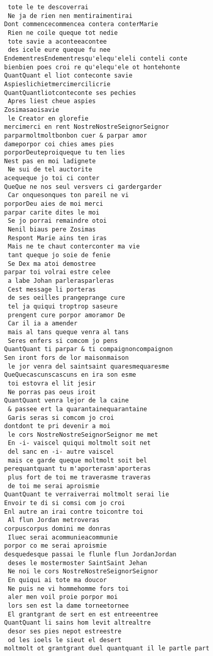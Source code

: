 \documentclass[
  letterpaper,
  DIV=11,
  numbers=noendperiod]{scrreprt}
\begin{document}
\begin{verbatim}
 tote le te descoverrai
 Ne ja de rien nen mentiraimentirai
Dont commencecommencea contera conterMarie
 Rien ne coile queque tot nedie
 tote savie a aconteeacontee
 des icele eure queque fu nee
EndementresEndementresqu'elequ'eleli conteli conte
bienbien poes croi re qu'elequ'ele ot hontehonte
QuantQuant el liot conteconte savie
Aspieslichietmercimercilicrie
QuantQuantliotconteconte ses pechies
 Apres liest cheue aspies
Zosimasaoisavie
 le Creator en glorefie
mercimerci en rent NostreNostreSeignorSeignor
parparmoltmoltbonbon cuer & parpar amor
dameporpor coi chies ames pies
porporDeuteproiqueque tu ten lies
Nest pas en moi ladignete
 Ne sui de tel auctorite
acequeque jo toi ci conter
QueQue ne nos seul versvers ci gardergarder
 Car onquesonques ton pareil ne vi
porporDeu aies de moi merci
parpar carite dites le moi
 Se jo porrai remaindre otoi
 Nenil biaus pere Zosimas
 Respont Marie ains ten iras
 Mais ne te chaut conterconter ma vie
 tant queque jo soie de fenie
 Se Dex ma atoi demostree
parpar toi volrai estre celee
 a labe Johan parlerasparleras
 Cest message li porteras
 de ses oeilles prangeprange cure
 tel ja quiqui troptrop saseure
 prengent cure porpor amoramor De
 Car il ia a amender
 mais al tans queque venra al tans
 Seres enfers si comcom jo pens
QuantQuant ti parpar & ti compaignoncompaignon
Sen iront fors de lor maisonmaison
 le jor venra del saintsaint quaresmequaresme
QueQuecascunscascuns en ira son esme
 toi estovra el lit jesir
 Ne porras pas oeus iroit
QuantQuant venra lejor de la caine
 & passee ert la quarantainequarantaine
 Garis seras si comcom jo croi
dontdont te pri devenir a moi
 le cors NostreNostreSeignorSeignor me met
 En -i- vaiscel quiqui moltmolt soit net
 del sanc en -i- autre vaiscel
 mais ce garde queque moltmolt soit bel
perequantquant tu m'aporterasm'aporteras
 plus fort de toi me traverasme traveras
 de toi me serai aproismie
QuantQuant te verraiverrai moltmolt serai lie
Envoir te di si comsi com jo croi
Enl autre an irai contre toicontre toi
 Al flun Jordan metroveras
corpuscorpus domini me donras
 Iluec serai acommunieacommunie
porpor co me serai aproismie
desquedesque passai le flunle flun JordanJordan
 deses le mostermoster SaintSaint Jehan
 Ne noi le cors NostreNostreSeignorSeignor
 En quiqui ai tote ma doucor
 Ne puis ne vi hommehomme fors toi
 aler men voil proie porpor moi
 lors sen est la dame torneetornee
 El grantgrant de sert en est entreeentree
QuantQuant li sains hom levit altrealtre
 desor ses pies nepot estreestre
 od les ioels le sieut el desert
moltmolt ot grantgrant duel quantquant il le partle part

\end{verbatim}
\end{document}

